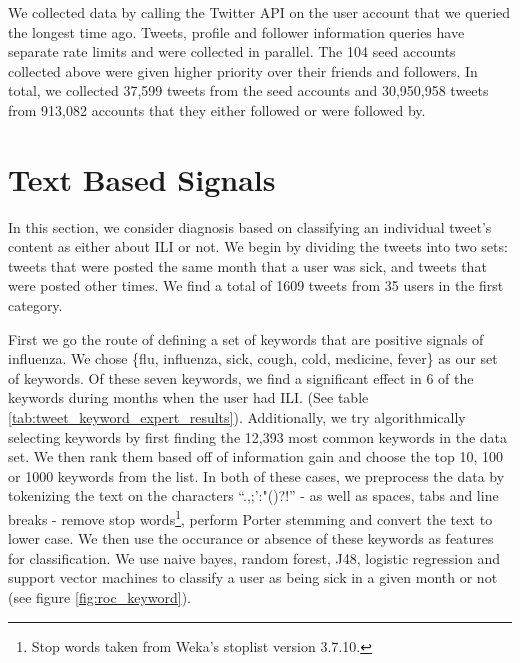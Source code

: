 \documentclass{acm_proc_article-sp}
\begin{document}
We collected data by calling the Twitter API on the user account that we queried the longest time ago. Tweets, profile and follower information queries have separate rate limits and were collected in parallel. The 104 seed accounts collected above were given higher priority over their friends and followers. In total, we collected 37,599 tweets from the seed accounts and 30,950,958 tweets from 913,082 accounts that they either followed or were followed by.


\section{Text Based Signals}
\label{sec:text_analysis}

In this section, we consider diagnosis based on classifying an individual tweet's content as either about ILI or not. We begin by dividing the tweets into two sets: tweets that were posted the same month that a user was sick, and tweets that were posted other times. We find a total of 1609 tweets from 35 users in the first category.

First we go the route of defining a set of keywords that are positive signals of influenza. We chose \{flu, influenza, sick, cough, cold, medicine, fever\} as our set of keywords. Of these seven keywords, we find a significant effect in 6 of the keywords during months when the user had ILI. (See table \ref{tab:tweet_keyword_expert_results}). Additionally, we try algorithmically selecting keywords by first finding the 12,393 most common keywords in the data set.  We then rank them based off of information gain and choose the top 10, 100 or 1000 keywords from the list. In both of these cases, we preprocess the data by tokenizing the text on the characters ``.,;':"()?!'' - as well as spaces, tabs and line breaks - remove stop words\footnote{Stop words taken from Weka's stoplist version 3.7.10.}, perform Porter stemming \cite{Porter:1980dd,Willett:2006vb}  and convert the text to lower case. We then use the occurance or absence of these keywords as features for classification. We use naive bayes, random forest, J48, logistic regression and support vector machines to classify a user as being sick in a given month or not (see figure \ref{fig:roc_keyword}).
\end{document}
